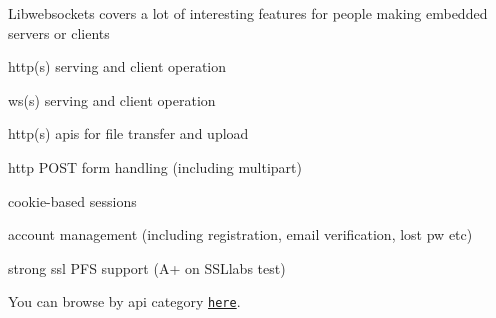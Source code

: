 Libwebsockets covers a lot of interesting features for people making embedded servers or clients


\begin{DoxyItemize}
\item http(s) serving and client operation
\item ws(s) serving and client operation
\item http(s) apis for file transfer and upload
\item http P\+O\+ST form handling (including multipart)
\item cookie-\/based sessions
\item account management (including registration, email verification, lost pw etc)
\item strong ssl P\+FS support (A+ on S\+S\+Llabs test)
\end{DoxyItemize}

You can browse by api category \href{modules.html}{\tt here}. 